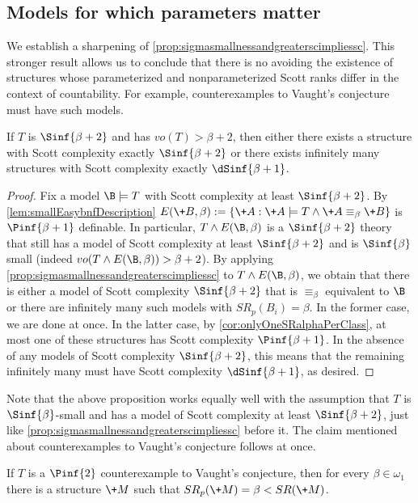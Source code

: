 \documentclass{amsart}
\renewcommand{\-}{\text{-}}
\begin{document}
\subsection{Models for which parameters matter}
We establish a sharpening of \cref{prop:sigmasmallnessandgreaterscimpliessc}.
This stronger result allows us to conclude that there is no avoiding the existence of structures whose parameterized and nonparameterized Scott ranks differ in the context of countability.
For example, counterexamples to Vaught's conjecture must have such models.

\begin{proposition}\label{prop:parametersMatter}
If $T$ is $\Sinf{\beta+2}$ and has $vo(T)>\beta+2$, then either there exists a structure with Scott complexity exactly $\Sinf{\beta+2}$ or there exists infinitely many structures with Scott complexity exactly $\dSinf{\beta+1}$.
\end{proposition}

\begin{proof}
Fix a model $\B\models T$ with Scott complexity at least $\Sinf{\beta+2}$.
By \cref{lem:smallEasybnfDescription} $E(\+B,\beta):=\{\+A : \+A\models T \land \+A\equiv_\beta \+B\}$ is $\Pinf{\beta+1}$ definable.
In particular, $T\land E(\B,\beta)$ is a $\Sinf{\beta+2}$ theory that still has a model of Scott complexity at least $\Sinf{\beta+2}$ and is $\Sinf{\beta}$ small (indeed $vo(T\land E(\B,\beta))>\beta+2$).
By applying \cref{prop:sigmasmallnessandgreaterscimpliessc} to $T\land E(\B,\beta)$, we obtain that there is either a model of Scott complexity $\Sinf{\beta+2}$ that is $\equiv_\beta$ equivalent to $\B$ or there are infinitely many such models with $SR_p(B_i)=\beta$.
In the former case, we are done at once.
In the latter case, by \cref{cor:onlyOneSRalphaPerClass}, at most one of these structures has Scott complexity $\Pinf{\beta+1}$.
In the absence of any models of Scott complexity $\Sinf{\beta+2}$, this means that the remaining infinitely many must have Scott complexity $\dSinf{\beta+1}$, as desired.
\end{proof}

Note that the above proposition works equally well with the assumption that $T$ is $\Sinf{\beta}$-small and has a model of Scott complexity at least $\Sinf{\beta+2}$, just like \cref{prop:sigmasmallnessandgreaterscimpliessc} before it.
The claim mentioned about counterexamples to Vaught's conjecture follows at once.

\begin{corollary}
  If $T$ is a $\Pinf{2}$ counterexample to Vaught's conjecture, then for every $\beta\in\omega_1$ there is a structure $\+M$ such that $SR_p(\+M)=\beta<SR(\+M)$.
\end{corollary}
\end{document}
